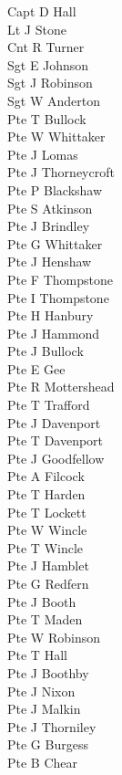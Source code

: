 \begin{multicols}{2}
  \small
  \noindent
  Capt D Hall \\
  Lt J Stone \\
  Cnt R Turner \\
  Sgt E Johnson \\
  Sgt J Robinson \\
  Sgt W Anderton \\
  Pte T Bullock \\
  Pte W Whittaker \\
  Pte J Lomas \\
  Pte J Thorneycroft \\
  Pte P Blackshaw \\
  Pte S Atkinson \\
  Pte J Brindley \\
  Pte G Whittaker \\
  Pte J Henshaw \\
  Pte F Thompstone \\
  Pte I Thompstone \\
  Pte H Hanbury \\
  Pte J Hammond \\
  Pte J Bullock \\
  Pte E Gee \\
  Pte R Mottershead \\
  Pte T Trafford \\
  Pte J Davenport \\
  Pte T Davenport \\
  Pte J Goodfellow \\
  Pte A Filcock \\
  Pte T Harden \\
  Pte T Lockett \\
  Pte W Wincle \\
  Pte T Wincle \\
  Pte J Hamblet \\
  Pte G Redfern \\
  Pte J Booth \\
  Pte T Maden \\
  Pte W Robinson \\
  Pte T Hall \\
  Pte J Boothby \\
  Pte J Nixon \\
  Pte J Malkin \\
  Pte J Thorniley \\
  Pte G Burgess \\
  Pte B Chear \\

\end{multicols}
